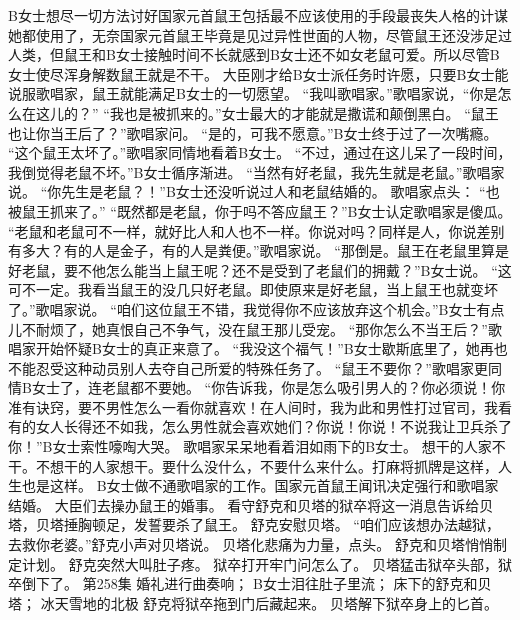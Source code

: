 \documentclass[a4paper,12pt,UTF8,twoside]{ctexbook}
\begin{document}
        B女士想尽一切方法讨好国家元首鼠王包括最不应该使用的手段最丧失人格的计谋她都使用了，无奈国家元首鼠王毕竟是见过异性世面的人物，尽管鼠王还没涉足过人类，但鼠王和B女士接触时间不长就感到B女士还不如女老鼠可爱。所以尽管B女士使尽浑身解数鼠王就是不干。  
        大臣刚才给B女士派任务时许愿，只要B女士能说服歌唱家，鼠王就能满足B女士的一切愿望。  
        “我叫歌唱家。”歌唱家说，“你是怎么在这儿的？”  
        “我也是被抓来的。”女士最大的才能就是撒谎和颠倒黑白。  
        “鼠王也让你当王后了？”歌唱家问。  
        “是的，可我不愿意。”B女士终于过了一次嘴瘾。  
        “这个鼠王太坏了。”歌唱家同情地看着B女士。  
        “不过，通过在这儿呆了一段时间，我倒觉得老鼠不坏。”B女士循序渐进。  
        “当然有好老鼠，我先生就是老鼠。”歌唱家说。  
        “你先生是老鼠？！”B女士还没听说过人和老鼠结婚的。        
        歌唱家点头：  
        “也被鼠王抓来了。”  
        “既然都是老鼠，你于吗不答应鼠王？”B女士认定歌唱家是傻瓜。  
        “老鼠和老鼠可不一样，就好比人和人也不一样。你说对吗？同样是人，你说差别有多大？有的人是金子，有的人是粪便。”歌唱家说。  
        “那倒是。鼠王在老鼠里算是好老鼠，要不他怎么能当上鼠王呢？还不是受到了老鼠们的拥戴？”B女士说。  
        “这可不一定。我看当鼠王的没几只好老鼠。即使原来是好老鼠，当上鼠王也就变坏了。”歌唱家说。  
        “咱们这位鼠王不错，我觉得你不应该放弃这个机会。”B女士有点儿不耐烦了，她真恨自己不争气，没在鼠王那儿受宠。  
        “那你怎么不当王后？”歌唱家开始怀疑B女士的真正来意了。  
        “我没这个福气！”B女士歇斯底里了，她再也不能忍受这种动员别人去夺自己所爱的特殊任务了。  
        “鼠王不要你？”歌唱家更同情B女士了，连老鼠都不要她。  
        “你告诉我，你是怎么吸引男人的？你必须说！你准有诀窍，要不男性怎么一看你就喜欢！在人间时，我为此和男性打过官司，我看有的女人长得还不如我，怎么男性就会喜欢她们？你说！你说！不说我让卫兵杀了你！”B女士索性嚎啕大哭。  
        歌唱家呆呆地看着泪如雨下的B女士。  
        想干的人家不干。不想干的人家想干。要什么没什么，不要什么来什么。打麻将抓牌是这样，人生也是这样。  
        B女士做不通歌唱家的工作。国家元首鼠王闻讯决定强行和歌唱家结婚。  
        大臣们去操办鼠王的婚事。  
        看守舒克和贝塔的狱卒将这一消息告诉给贝塔，贝塔捶胸顿足，发誓要杀了鼠王。  
        舒克安慰贝塔。  
        “咱们应该想办法越狱，去救你老婆。”舒克小声对贝塔说。  
        贝塔化悲痛为力量，点头。  
        舒克和贝塔悄悄制定计划。  
        舒克突然大叫肚子疼。  
        狱卒打开牢门问怎么了。  
        贝塔猛击狱卒头部，狱卒倒下了。          第258集  
        婚礼进行曲奏响；  
        B女士泪往肚子里流；  
        床下的舒克和贝塔；  
        冰天雪地的北极    
        舒克将狱卒拖到门后藏起来。  
        贝塔解下狱卒身上的匕首。  
\end{document}
